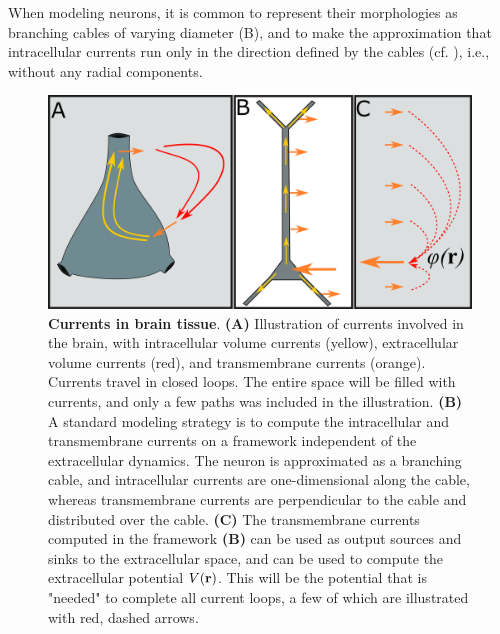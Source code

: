 When modeling neurons, it is common to represent their morphologies as branching cables of varying diameter (B), and to make the approximation that intracellular currents run only in the direction defined by the cables (cf. ), i.e., without any radial components. 


\begin{figure}[!ht]
\begin{center}
\includegraphics[width=1.0\textwidth]{Figures/Basics/Twostep.png}
\end{center}
\caption{{\bf Currents in brain tissue}. {\bf(A)} Illustration of currents involved in the brain, with intracellular volume currents (yellow), extracellular volume currents (red), and transmembrane currents (orange). Currents travel in closed loops. The entire space will be filled with currents, and only a few paths was included in the illustration. {\bf(B)} A standard modeling strategy is to compute the intracellular and transmembrane currents on a framework independent of the extracellular dynamics. The neuron is approximated as a branching cable, and intracellular currents are one-dimensional along the cable, whereas transmembrane currents are perpendicular to the cable and distributed over the cable. {\bf(C)} The transmembrane currents computed in the framework {\bf(B)} can be used as output sources and sinks to the extracellular space, and can be used to compute the extracellular potential $V({\bf r})$. This will be the potential that is "needed" to complete all current loops, a few of which are illustrated with red, dashed arrows.
 
}
\label{fig:Basics:Twostep}
\end{figure}



